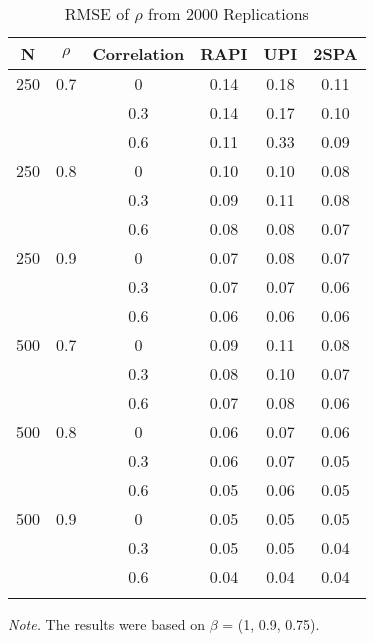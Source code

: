 \documentclass[
  man]{apa7}
\begin{document}
\begin{table}[tbp]

\begin{center}
\begin{threeparttable}

\caption{\label{tab:unnamed-chunk-4}RMSE of $\rho$ from 2000 Replications}

\begin{tabular}{cccccc}
\toprule
N & \multicolumn{1}{c}{$\rho$} & \multicolumn{1}{c}{Correlation} & \multicolumn{1}{c}{RAPI} & \multicolumn{1}{c}{UPI} & \multicolumn{1}{c}{2SPA}\\
\midrule
250 & 0.7 & 0 & 0.14 & 0.18 & 0.11\\
 &  & 0.3 & 0.14 & 0.17 & 0.10\\
 &  & 0.6 & 0.11 & 0.33 & 0.09\\
250 & 0.8 & 0 & 0.10 & 0.10 & 0.08\\
 &  & 0.3 & 0.09 & 0.11 & 0.08\\
 &  & 0.6 & 0.08 & 0.08 & 0.07\\
250 & 0.9 & 0 & 0.07 & 0.08 & 0.07\\
 &  & 0.3 & 0.07 & 0.07 & 0.06\\
 &  & 0.6 & 0.06 & 0.06 & 0.06\\
500 & 0.7 & 0 & 0.09 & 0.11 & 0.08\\
 &  & 0.3 & 0.08 & 0.10 & 0.07\\
 &  & 0.6 & 0.07 & 0.08 & 0.06\\
500 & 0.8 & 0 & 0.06 & 0.07 & 0.06\\
 &  & 0.3 & 0.06 & 0.07 & 0.05\\
 &  & 0.6 & 0.05 & 0.06 & 0.05\\
500 & 0.9 & 0 & 0.05 & 0.05 & 0.05\\
 &  & 0.3 & 0.05 & 0.05 & 0.04\\
 &  & 0.6 & 0.04 & 0.04 & 0.04\\
\bottomrule
\addlinespace
\end{tabular}

\begin{tablenotes}[para]
\normalsize{\textit{Note.} The results were based on $\beta$ = (1, 0.9, 0.75).}
\end{tablenotes}

\end{threeparttable}
\end{center}

\end{table}
\end{document}
